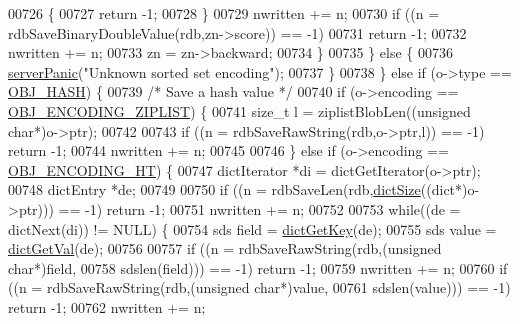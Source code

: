 \begin{DoxyCode}
{{{{{{{{00726                 \{
00727                     \textcolor{keywordflow}{return} -1;
00728                 \}
00729                 nwritten += n;
00730                 \textcolor{keywordflow}{if} ((n = rdbSaveBinaryDoubleValue(rdb,zn->score)) == -1)
00731                     \textcolor{keywordflow}{return} -1;
00732                 nwritten += n;
00733                 zn = zn->backward;
00734             \}
00735         \} \textcolor{keywordflow}{else} \{
00736             \hyperlink{server_8h_a11cc378e7778a830b41240578de3b204}{serverPanic}(\textcolor{stringliteral}{"Unknown sorted set encoding"});
00737         \}
00738     \} \textcolor{keywordflow}{else} \textcolor{keywordflow}{if} (o->type == \hyperlink{server_8h_a87c05ba4f7f36741864277f02a4423fb}{OBJ\_HASH}) \{
00739         \textcolor{comment}{/* Save a hash value */}
00740         \textcolor{keywordflow}{if} (o->encoding == \hyperlink{server_8h_aabf064ede983103f1fd0df2086e84eee}{OBJ\_ENCODING\_ZIPLIST}) \{
00741             size\_t l = ziplistBlobLen((\textcolor{keywordtype}{unsigned} \textcolor{keywordtype}{char}*)o->ptr);
00742 
00743             \textcolor{keywordflow}{if} ((n = rdbSaveRawString(rdb,o->ptr,l)) == -1) \textcolor{keywordflow}{return} -1;
00744             nwritten += n;
00745 
00746         \} \textcolor{keywordflow}{else} \textcolor{keywordflow}{if} (o->encoding == \hyperlink{server_8h_a9c10219f68afc557d510d108257d238b}{OBJ\_ENCODING\_HT}) \{
00747             dictIterator *di = dictGetIterator(o->ptr);
00748             dictEntry *de;
00749 
00750             \textcolor{keywordflow}{if} ((n = rdbSaveLen(rdb,\hyperlink{dict_8h_af193430dd3d5579a52b194512f72c1f0}{dictSize}((dict*)o->ptr))) == -1) \textcolor{keywordflow}{return} -1;
00751             nwritten += n;
00752 
00753             \textcolor{keywordflow}{while}((de = dictNext(di)) != NULL) \{
00754                 sds field = \hyperlink{dict_8h_a3271c334309904a3086deca94f96e46e}{dictGetKey}(de);
00755                 sds value = \hyperlink{dict_8h_ae8d2cc391873b2bea2b87c4f80f43120}{dictGetVal}(de);
00756 
00757                 \textcolor{keywordflow}{if} ((n = rdbSaveRawString(rdb,(\textcolor{keywordtype}{unsigned} \textcolor{keywordtype}{char}*)field,
00758                         sdslen(field))) == -1) \textcolor{keywordflow}{return} -1;
00759                 nwritten += n;
00760                 \textcolor{keywordflow}{if} ((n = rdbSaveRawString(rdb,(\textcolor{keywordtype}{unsigned} \textcolor{keywordtype}{char}*)value,
00761                         sdslen(value))) == -1) \textcolor{keywordflow}{return} -1;
00762                 nwritten += n;
}}}}}}}}
\end{DoxyCode}
